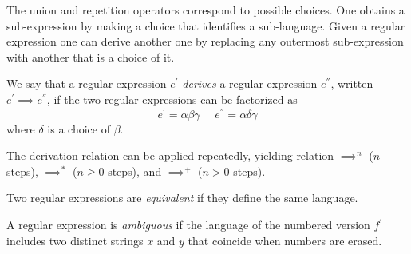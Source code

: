 The union and repetition operators correspond to possible choices. One obtains a sub-expression by making a choice that identifies a sub-language. Given a regular expression 
one can derive another one by replacing any outermost sub-expression with another that is a choice of it. 
\begin{definition}
    We say that a regular expression $e^{'}$ \emph{derives} a regular expression $e^{''}$, written $e^{'} \implies e^{''}$, if the two regular expressions can be factorized as 
    \[e^{'}=\alpha \beta \gamma \:\:\:\:\:\: e^{''}=\alpha \delta \gamma\]
    where $\delta$ is a choice of $\beta$.
\end{definition}
The derivation relation can be applied repeatedly, yielding relation $\implies^{n}$ ($n$ steps), $\implies^{*}$ ($n \geq 0$ steps), and $\implies^{+}$ ($n > 0$ steps). 
\begin{definition}
    Two regular expressions are \emph{equivalent} if they define the same language. 

    A regular expression is \emph{ambiguous} if the language of the numbered version $f^{'}$ includes two distinct strings $x$ and $y$ that coincide when numbers are erased. 
\end{definition}